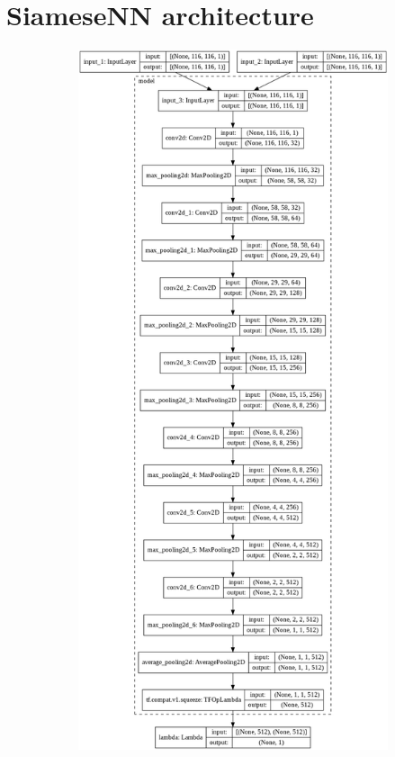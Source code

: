 \clearpage
\section{SiameseNN architecture}\label{apx:siamese-architecture}

\begin{figure}[ht!]
    \centering
    \begin{subfigure}[t]{0.5\linewidth}
        \includegraphics[width=\linewidth]{figures/model_plot_256d.png}

\end{subfigure}
\end{figure}
